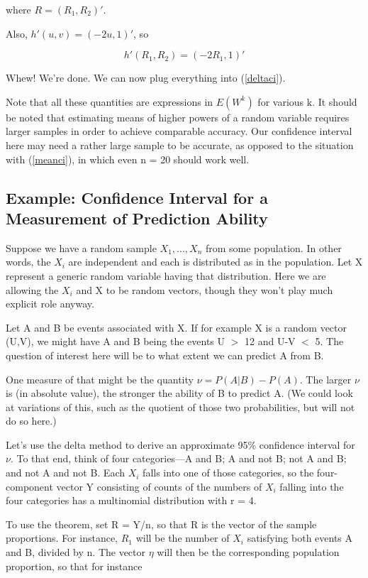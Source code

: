 where $R = (R_1,R_2)'$.

Also, $h'(u,v) = (-2u,1)'$, so

\begin{equation}
h'(R_1,R_2) = (-2R_1,1)' 
\end{equation}

Whew!  We're done.  We can now plug everything into (\ref{deltaci}).

Note that all these quantities are expressions in $E(W^k)$ for various
k.  It should be noted that estimating means of higher powers of a
random variable requires larger samples in order to achieve comparable
accuracy.  Our confidence interval here may need a rather large sample
to be accurate, as opposed to the situation with (\ref{meanci}), in
which even n = 20 should work well.

\subsection{Example:  Confidence Interval for a Measurement of
Prediction Ability}

Suppose we have a random sample $X_1,...,X_n$ from some population. In
other words, the $X_i$ are independent and each is distributed as in the
population. Let X represent a generic random variable having that
distribution. Here we are allowing the $X_i$ and X to be random vectors,
though they won't play much explicit role anyway.

Let A and B be events associated with X. If for example X is a random
vector (U,V), we might have A and B being the events U $>$ 12 and U-V
$<$ 5. The question of interest here will be to what extent we can
predict A from B.

One measure of that might be the quantity $\nu = P(A|B) - P(A)$. The
larger $\nu$ is (in absolute value), the stronger the ability of B to
predict A. (We could look at variations of this, such as the quotient of
those two probabilities, but will not do so here.)

Let's use the delta method to derive an approximate 95\% confidence
interval for $\nu$.  To that end, think of four categories---A and B; A
and not B; not A and B; and not A and not B. Each $X_i$ falls into one of
those categories, so the four-component vector Y consisting of counts of
the numbers of $X_i$ falling into the four categories has a multinomial
distribution with r = 4.

To use the theorem, set R = Y/n, so that R is the vector of the sample
proportions.  For instance, $R_1$ will be the number of $X_i$ satisfying
both events A and B, divided by n.  The vector $\eta$ will then be the
corresponding population proportion, so that for instance 

